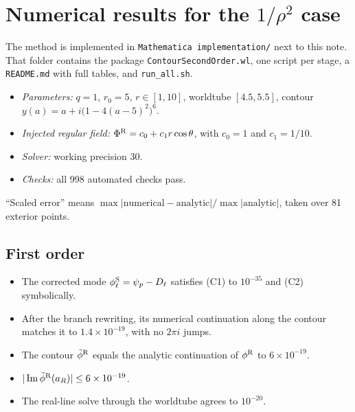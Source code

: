 \documentclass[11pt,a4paper]{article}
\renewcommand{\Im}{\operatorname{Im}}
\newcommand{\PhiR}{\Phi^{\rm R}}
\newcommand{\phiS}{\phi^{\rm S}}
\newcommand{\phiR}{\phi^{\rm R}}
\newcommand{\code}[1]{\texttt{#1}}
\begin{document}
\section{Numerical results for the \texorpdfstring{$1/\rho^2$}{1/rho\^2} case}\label{sec:numerics}

The method is implemented in \code{Mathematica implementation/} next to this note.
That folder contains the package \code{ContourSecondOrder.wl}, one script per stage, a \code{README.md} with full tables, and \code{run\_all.sh}.
\begin{itemize}[nosep]
\item \emph{Parameters:} $q=1$, $r_0=5$, $r\in[1,10]$, worldtube $[4.5,5.5]$, contour $y(a)=a+i\big(1-4(a-5)^2\big)^6$.
\item \emph{Injected regular field:} $\PhiR=c_0+c_1r\cos\theta$, with $c_0=1$ and $c_1=1/10$.
\item \emph{Solver:} working precision 30.
\item \emph{Checks:} all 998 automated checks pass.
\end{itemize}
``Scaled error'' means $\max|\text{numerical}-\text{analytic}|/\max|\text{analytic}|$, taken over 81 exterior points.

\subsection{First order}
\begin{itemize}[nosep]
\item The corrected mode $\phiS_\ell=\psi_p-D_\ell$ satisfies (C1) to $10^{-35}$ and (C2) symbolically.
\item After the branch rewriting, its numerical continuation along the contour matches it to $1.4\times10^{-19}$, with no $2\pi i$ jumps.
\item The contour $\tilde\phi^{\rm R}$ equals the analytic continuation of $\phiR$ to $6\times10^{-19}$.
\item $|\Im\tilde\phi^{\rm R}(a_R)|\le6\times10^{-19}$.
\item The real-line solve through the worldtube agrees to $10^{-20}$.
\end{itemize}
\end{document}
